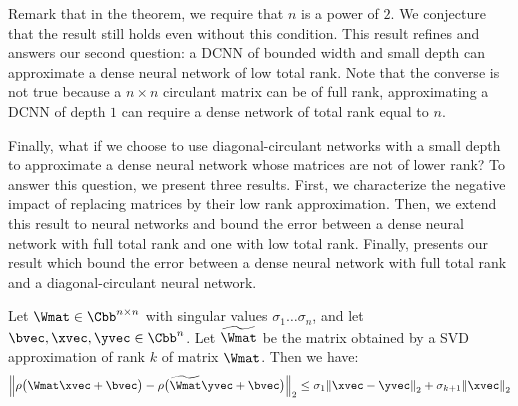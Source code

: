 \noindent
Remark that in the theorem, we require that $n$ is a power of $2$.
We conjecture that the result still holds even without this condition.
This result refines  and answers our second question: a DCNN of bounded width and small depth can approximate a dense neural network of low total rank.
Note that the converse is not true because a $n \times n$ circulant matrix can be of full rank, approximating a DCNN of depth $1$ can require a dense network of total rank equal to $n$.

Finally, what if we choose to use diagonal-circulant networks with a small depth to approximate a dense neural network whose matrices are not of lower rank? 
To answer this question, we present three results. First, we characterize the negative impact of replacing matrices by their low rank approximation.
Then, we extend this result to neural networks and bound the error between a dense neural network with full total rank and one with low total rank.
Finally,  presents our result which bound the error between a dense neural network with full total rank and a diagonal-circulant neural network.


\begin{lemma} \label{lemma:ch4-bound_one_layer}
  Let $\Wmat \in \Cnn$ with singular values $\sigma_1 \ldots \sigma_n$, and let $\bvec, \xvec, \yvec \in \Cn$.
  Let $\widetilde{\Wmat}$ be the matrix obtained by a SVD approximation of rank $k$ of matrix $\Wmat$.
  Then we have:
  \begin{equation}
    \norm{ \act \big( \Wmat\xvec + \bvec \big) - \act \big( \widetilde{\Wmat}\yvec + \bvec \big)}_2 \le \sigma_{1} \norm{\xvec - \yvec}_2 + \sigma_{k+1} \norm{\xvec}_2 
  \end{equation}
  \removespace
\end{lemma}

